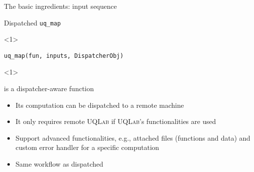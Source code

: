 \documentclass[]{rsuqbeamernew}
\begin{document}
\begin{frame}[fragile]{The basic ingredients: input sequence}

\end{frame}

\begin{frame}[fragile]{Dispatched \texttt{uq\_map}}

\begin{onlyenv}<1>
\begin{lstlisting}[basicstyle=\large,numbers=none]
uq_map(fun, inputs, DispatcherObj)
\end{lstlisting}
\end{onlyenv}

\begin{onlyenv}<1>
\begin{block}{ is a dispatcher-aware function}
\begin{itemize}
  \item Its computation can be dispatched to a remote machine
  \item It only requires remote \textsc{UQLab} if \textsc{UQLab}'s functionalities are used
  \item Support advanced functionalities,
        e.g., attached files (functions and data) and custom error handler for a specific computation
  \item Same workflow as dispatched 
\end{itemize}
\end{block}
\end{onlyenv}


\end{frame}
\end{document}
